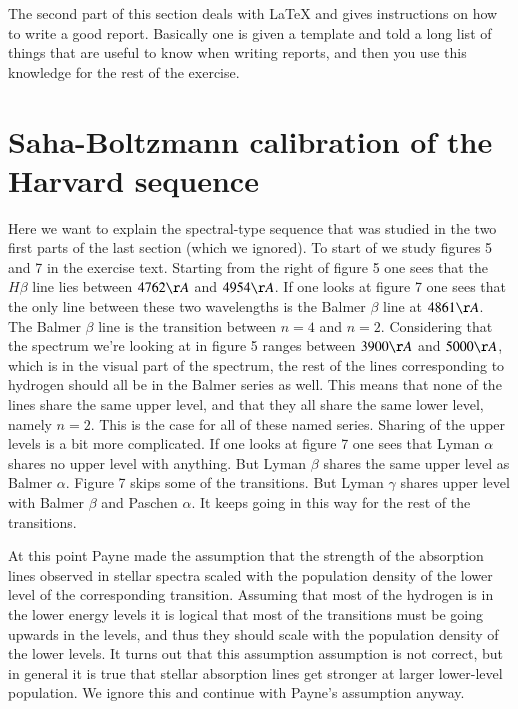 \documentclass{aa}   %
\begin{document}
The second part of this section deals with LaTeX and gives instructions on how to write a good report.
Basically one is given a template and told a long list of things that are useful to know when writing reports, and then you use this knowledge for the rest of the exercise.

\section{Saha-Boltzmann calibration of the Harvard sequence}   \label{sec:Saha}
Here we want to explain the spectral-type sequence that was studied in the two first parts of the last section (which we ignored).
To start of we study figures 5 and 7 in the exercise text. 
Starting from the right of figure 5 one sees that the $H\beta$ line lies between $4762 \AA$ and $4954 \AA$. 
If one looks at figure 7 one sees that the only line between these two wavelengths is the Balmer $\beta$ line at $4861 \AA$. The Balmer $\beta$ line is the transition between $n = 4$ and $n = 2$. 
Considering that the spectrum we're looking at in figure 5 ranges between $3900 \AA$ and $5000 \AA$, which is in the visual part of the spectrum, the rest of the lines corresponding to hydrogen should all be in the Balmer series as well. 
This means that none of the lines share the same upper level, and that they all share the same lower level, namely $n = 2$.
This is the case for all of these named series. Sharing of the upper levels is a bit more complicated. 
If one looks at figure 7 one sees that Lyman $\alpha$ shares no upper level with anything. 
But Lyman $\beta$ shares the same upper level as Balmer $\alpha$. 
Figure 7 skips some of the transitions. 
But Lyman $\gamma$ shares upper level with Balmer $\beta$ and Paschen $\alpha$. 
It keeps going in this way for the rest of the transitions.

At this point Payne made the assumption that the strength of the absorption lines observed in stellar spectra scaled with the population density of the lower level of the corresponding transition. Assuming that most of the hydrogen is in the lower energy levels it is logical that most of the transitions must be going upwards in the levels, and thus they should scale with the population density of the lower levels. It turns out that this assumption assumption is not correct, but in general it is true that stellar absorption lines get stronger at larger lower-level population. We ignore this and continue with Payne's assumption anyway.
\end{document}
